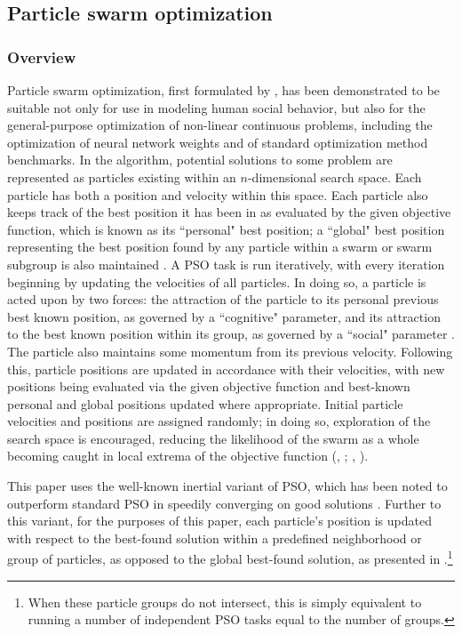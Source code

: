 \documentclass[11pt]{article}
\begin{document}
\subsection{Particle swarm optimization}
\subsubsection{Overview}
Particle swarm optimization, first formulated by \cite{kennedy1995}, has been demonstrated to be suitable not only for use in modeling human social behavior, but also for the general-purpose optimization of non-linear continuous problems, including the optimization of neural network weights and of standard optimization method benchmarks. In the algorithm, potential solutions to some problem are represented as particles existing within an $n$-dimensional search space. Each particle has both a position and velocity within this space. Each particle also keeps track of the best position it has been in as evaluated by the given objective function, which is known as its ``personal" best position; a ``global" best position representing the best position found by any particle within a swarm or swarm subgroup is also maintained \citep{chong2013}. A PSO task is run iteratively, with every iteration beginning by updating the velocities of all particles. In doing so, a particle is acted upon by two forces: the attraction of the particle to its personal previous best known position, as governed by a ``cognitive" parameter, and its attraction to the best known position within its group, as governed by a ``social" parameter \citep{chong2013}. The particle also maintains some momentum from its previous velocity. Following this, particle positions are updated in accordance with their velocities, with new positions being evaluated via the given objective function and best-known personal and global positions updated where appropriate. Initial particle velocities and positions are assigned randomly; in doing so, exploration of the search space is encouraged, reducing the likelihood of the swarm as a whole becoming caught in local extrema of the objective function (\citeauthor{yang2014}, \citeyear{yang2014}; \citeauthor{solnon2010}, \citeyear{solnon2010}). 

This paper uses the well-known inertial variant of PSO, which has been noted to outperform standard PSO in speedily converging on good solutions \citep{yang2014}. Further to this variant, for the purposes of this paper, each particle's position is updated with respect to the best-found solution within a predefined neighborhood or group of particles, as opposed to the global best-found solution, as presented in \citet*{solnon2010}.\footnote{When these particle groups do not intersect, this is simply equivalent to running a number of independent PSO tasks equal to the number of groups.}
\end{document}
